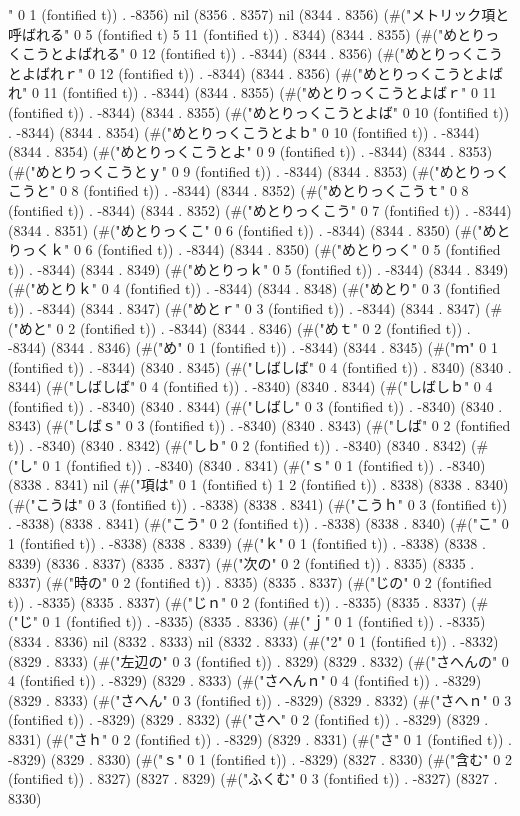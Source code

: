 " 0 1 (fontified t)) . -8356) nil (8356 . 8357) nil (8344 . 8356) (#("メトリック項と呼ばれる" 0 5 (fontified t) 5 11 (fontified t)) . 8344) (8344 . 8355) (#("めとりっくこうとよばれる" 0 12 (fontified t)) . -8344) (8344 . 8356) (#("めとりっくこうとよばれｒ" 0 12 (fontified t)) . -8344) (8344 . 8356) (#("めとりっくこうとよばれ" 0 11 (fontified t)) . -8344) (8344 . 8355) (#("めとりっくこうとよばｒ" 0 11 (fontified t)) . -8344) (8344 . 8355) (#("めとりっくこうとよば" 0 10 (fontified t)) . -8344) (8344 . 8354) (#("めとりっくこうとよｂ" 0 10 (fontified t)) . -8344) (8344 . 8354) (#("めとりっくこうとよ" 0 9 (fontified t)) . -8344) (8344 . 8353) (#("めとりっくこうとｙ" 0 9 (fontified t)) . -8344) (8344 . 8353) (#("めとりっくこうと" 0 8 (fontified t)) . -8344) (8344 . 8352) (#("めとりっくこうｔ" 0 8 (fontified t)) . -8344) (8344 . 8352) (#("めとりっくこう" 0 7 (fontified t)) . -8344) (8344 . 8351) (#("めとりっくこ" 0 6 (fontified t)) . -8344) (8344 . 8350) (#("めとりっくｋ" 0 6 (fontified t)) . -8344) (8344 . 8350) (#("めとりっく" 0 5 (fontified t)) . -8344) (8344 . 8349) (#("めとりっｋ" 0 5 (fontified t)) . -8344) (8344 . 8349) (#("めとりｋ" 0 4 (fontified t)) . -8344) (8344 . 8348) (#("めとり" 0 3 (fontified t)) . -8344) (8344 . 8347) (#("めとｒ" 0 3 (fontified t)) . -8344) (8344 . 8347) (#("めと" 0 2 (fontified t)) . -8344) (8344 . 8346) (#("めｔ" 0 2 (fontified t)) . -8344) (8344 . 8346) (#("め" 0 1 (fontified t)) . -8344) (8344 . 8345) (#("ｍ" 0 1 (fontified t)) . -8344) (8340 . 8345) (#("しばしば" 0 4 (fontified t)) . 8340) (8340 . 8344) (#("しばしば" 0 4 (fontified t)) . -8340) (8340 . 8344) (#("しばしｂ" 0 4 (fontified t)) . -8340) (8340 . 8344) (#("しばし" 0 3 (fontified t)) . -8340) (8340 . 8343) (#("しばｓ" 0 3 (fontified t)) . -8340) (8340 . 8343) (#("しば" 0 2 (fontified t)) . -8340) (8340 . 8342) (#("しｂ" 0 2 (fontified t)) . -8340) (8340 . 8342) (#("し" 0 1 (fontified t)) . -8340) (8340 . 8341) (#("ｓ" 0 1 (fontified t)) . -8340) (8338 . 8341) nil (#("項は" 0 1 (fontified t) 1 2 (fontified t)) . 8338) (8338 . 8340) (#("こうは" 0 3 (fontified t)) . -8338) (8338 . 8341) (#("こうｈ" 0 3 (fontified t)) . -8338) (8338 . 8341) (#("こう" 0 2 (fontified t)) . -8338) (8338 . 8340) (#("こ" 0 1 (fontified t)) . -8338) (8338 . 8339) (#("ｋ" 0 1 (fontified t)) . -8338) (8338 . 8339) (8336 . 8337) (8335 . 8337) (#("次の" 0 2 (fontified t)) . 8335) (8335 . 8337) (#("時の" 0 2 (fontified t)) . 8335) (8335 . 8337) (#("じの" 0 2 (fontified t)) . -8335) (8335 . 8337) (#("じｎ" 0 2 (fontified t)) . -8335) (8335 . 8337) (#("じ" 0 1 (fontified t)) . -8335) (8335 . 8336) (#("ｊ" 0 1 (fontified t)) . -8335) (8334 . 8336) nil (8332 . 8333) nil (8332 . 8333) (#("2" 0 1 (fontified t)) . -8332) (8329 . 8333) (#("左辺の" 0 3 (fontified t)) . 8329) (8329 . 8332) (#("さへんの" 0 4 (fontified t)) . -8329) (8329 . 8333) (#("さへんｎ" 0 4 (fontified t)) . -8329) (8329 . 8333) (#("さへん" 0 3 (fontified t)) . -8329) (8329 . 8332) (#("さへｎ" 0 3 (fontified t)) . -8329) (8329 . 8332) (#("さへ" 0 2 (fontified t)) . -8329) (8329 . 8331) (#("さｈ" 0 2 (fontified t)) . -8329) (8329 . 8331) (#("さ" 0 1 (fontified t)) . -8329) (8329 . 8330) (#("ｓ" 0 1 (fontified t)) . -8329) (8327 . 8330) (#("含む" 0 2 (fontified t)) . 8327) (8327 . 8329) (#("ふくむ" 0 3 (fontified t)) . -8327) (8327 . 8330) 